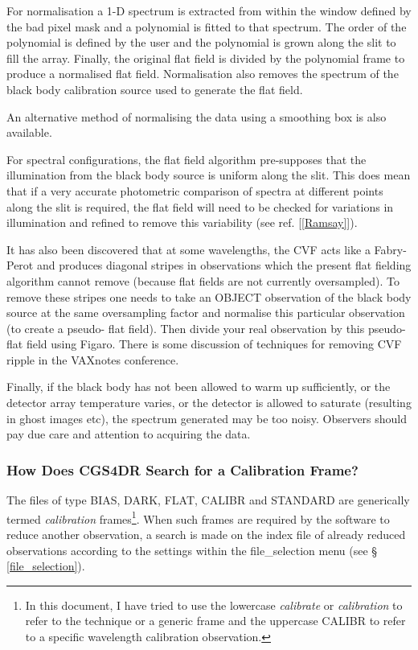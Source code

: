 {For normalisation a 1-D spectrum is extracted from within the window defined
by the bad pixel mask and a polynomial is fitted to that spectrum. The order
of the polynomial is defined by the user and the polynomial is grown along the
slit to fill the array. Finally, the original flat field is divided by the
polynomial frame to produce a normalised flat field. Normalisation also 
removes the spectrum of the black body calibration source used to generate
the flat field.

An alternative method of normalising the data using a smoothing box is also
available.

For spectral configurations, the flat field algorithm pre-supposes that the
illumination from the black body source is uniform along the slit. 
This does mean that if a very accurate photometric comparison of spectra 
at different points along the slit is required, the flat field will need to be 
checked for variations in illumination and refined to remove this variability
(see ref. [\ref{Ramsay}]).

It has also been discovered that at some wavelengths, the CVF acts
like a Fabry-Perot and produces diagonal stripes in observations which the
present flat fielding algorithm cannot remove (because flat fields are 
not currently oversampled). To remove these stripes one needs to take an
{\sf OBJECT} observation of the black body source at the same oversampling 
factor and normalise this particular observation (to create a pseudo- flat 
field). Then divide your real observation by this pseudo- flat field using 
Figaro. There is some discussion of techniques for removing CVF ripple in the 
VAXnotes conference.

Finally, if the black body has not been allowed to warm up sufficiently,
or the detector array temperature varies, or the detector is allowed to
saturate (resulting in ghost images etc), the spectrum generated may be
too noisy. Observers should pay due care and attention to acquiring the
data.

\subsubsection{How Does CGS4DR Search for a Calibration Frame?}
\label{how_does_cgs4dr_search_for_a_calibration_frame}

The files of type {\sf BIAS}, {\sf DARK}, {\sf FLAT}, {\sf CALIBR} and 
{\sf STANDARD} are generically termed {\em calibration} frames\footnote{In 
this document, I have tried to use the lowercase {\em calibrate} or {\em
calibration} to refer to the technique or a generic frame and the uppercase
{\sf CALIBR} to refer to a specific wavelength calibration observation.}.
When such frames are required by the software to reduce another observation,
a search is made on the index file of already reduced observations according
to the settings within the {\sf file\_selection} menu (see \S 
\ref{file_selection}). 

}
